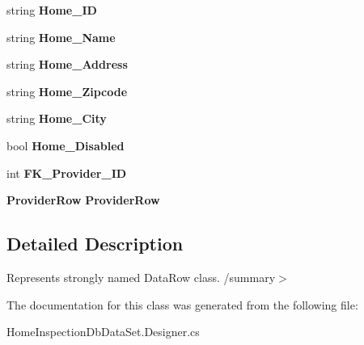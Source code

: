 \begin{DoxyCompactItemize}
\item 
\mbox{\label{class_a_f_h___scheduler_1_1_home_inspection_db_data_set_1_1_home_row_a3da2dc755825c907cceef4048393329c}} 
string {\bfseries Home\+\_\+\+ID}\hspace{0.3cm}{\ttfamily  [get, set]}
\item 
\mbox{\label{class_a_f_h___scheduler_1_1_home_inspection_db_data_set_1_1_home_row_afa80cc34277ba1e08f374f6f0e981be4}} 
string {\bfseries Home\+\_\+\+Name}\hspace{0.3cm}{\ttfamily  [get, set]}
\item 
\mbox{\label{class_a_f_h___scheduler_1_1_home_inspection_db_data_set_1_1_home_row_aa50ce162b46bb644ca338ed95db6cba9}} 
string {\bfseries Home\+\_\+\+Address}\hspace{0.3cm}{\ttfamily  [get, set]}
\item 
\mbox{\label{class_a_f_h___scheduler_1_1_home_inspection_db_data_set_1_1_home_row_a965a4a030c775685cd937da99046239f}} 
string {\bfseries Home\+\_\+\+Zipcode}\hspace{0.3cm}{\ttfamily  [get, set]}
\item 
\mbox{\label{class_a_f_h___scheduler_1_1_home_inspection_db_data_set_1_1_home_row_a3b7fb73e63cd2dae0ab782da34d12302}} 
string {\bfseries Home\+\_\+\+City}\hspace{0.3cm}{\ttfamily  [get, set]}
\item 
\mbox{\label{class_a_f_h___scheduler_1_1_home_inspection_db_data_set_1_1_home_row_a23be07e594a89ca993a999e9e0d2ce25}} 
bool {\bfseries Home\+\_\+\+Disabled}\hspace{0.3cm}{\ttfamily  [get, set]}
\item 
\mbox{\label{class_a_f_h___scheduler_1_1_home_inspection_db_data_set_1_1_home_row_a4c5d57e4b54e913b7ce188ac7fb6f535}} 
int {\bfseries F\+K\+\_\+\+Provider\+\_\+\+ID}\hspace{0.3cm}{\ttfamily  [get, set]}
\item 
\mbox{\label{class_a_f_h___scheduler_1_1_home_inspection_db_data_set_1_1_home_row_ad2fdcccdd4cc0ab6a72e4a6f2535ecce}} 
\textbf{ Provider\+Row} {\bfseries Provider\+Row}\hspace{0.3cm}{\ttfamily  [get, set]}
\end{DoxyCompactItemize}


\subsection{Detailed Description}
Represents strongly named Data\+Row class. /summary$>$ 

The documentation for this class was generated from the following file\+:\begin{DoxyCompactItemize}
\item 
Home\+Inspection\+Db\+Data\+Set.\+Designer.\+cs\end{DoxyCompactItemize}
